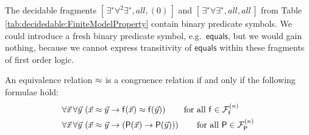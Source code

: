 \begin{remark}

	The decidable fragments \( [\,\exists^{∗}\forall^2\exists^{∗} , all, (0) \,] \) 
	and \( [\,\exists^{∗}\forall\exists^{∗}, all, all \,] \)
	from Table \vref{tab:decidedable:FiniteModelProperty}
	contain binary predicate symbols. 
	We could introduce a fresh binary predicate symbol, e.g.~\( \mathsf{equals}\),
	but we would gain nothing, because we cannot express transitivity of \( \mathsf{equals} \)
	within these fragments of first order logic.
\end{remark}

\begin{definition}
	 An equivalence relation \( \approx \) is a congruence relation if and only if
	the following formulae hold\label{def:congruence:schemata}:
	\begin{align*}
	\forall\vecn{x}\,\forall\vecn{y}\,
	&\left(\vecn{x}\mEQ\vecn{y} \limp \mf(\vecn{x}) \mEQ \mf(\vecn{y}) \right)
	\tag*{for all \( \mf\in\mcFfn \)}
	\\
	\forall\vecn{x}\,\forall\vecn{y}\,
	&\left(\vecn{x}\mEQ\vecn{y} \limp (\mP(\vecn{x}) \limp \mP(\vecn{y}))\right)
	\tag*{for all \( \mP\in\mcFPn \)}
	\end{align*}
\end{definition}

